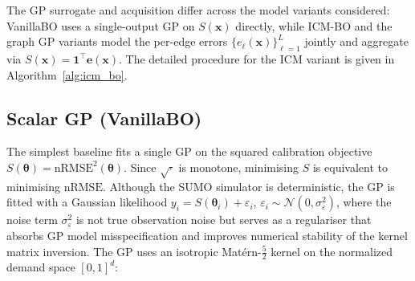 \documentclass[11pt]{article}
\begin{document}
The GP surrogate and acquisition differ across the model variants
considered: VanillaBO uses a single-output GP on $S(\mathbf{x})$
directly, while ICM-BO and the graph GP variants model the
per-edge errors $\{e_\ell(\mathbf{x})\}_{\ell=1}^L$ jointly and
aggregate via $S(\mathbf{x}) = \mathbf{1}^\top \mathbf{e}(\mathbf{x})$.
The detailed procedure for the ICM variant is given in
Algorithm~\ref{alg:icm_bo}.







\subsection{Scalar GP (VanillaBO)}
\label{subsec:vanillabo}

The simplest baseline fits a single GP on the squared calibration
objective $S(\boldsymbol{\theta}) = \mathrm{nRMSE}^2(\boldsymbol{\theta})$.
Since $\sqrt{\cdot}$ is monotone, minimising $S$ is equivalent to minimising
$\mathrm{nRMSE}$. Although the SUMO simulator is deterministic,
the GP is fitted with a Gaussian likelihood
$y_i = S(\boldsymbol{\theta}_i) + \varepsilon_i$,
$\varepsilon_i \sim \mathcal{N}(0, \sigma^2_\varepsilon)$,
where the noise term $\sigma^2_\varepsilon$ is not true observation noise
but serves as a regulariser that absorbs GP model misspecification and
improves numerical stability of the kernel matrix inversion.
The GP uses an isotropic Mat\'{e}rn-$\tfrac{5}{2}$ kernel on the normalized
demand space $[0,1]^d$:
\end{document}
